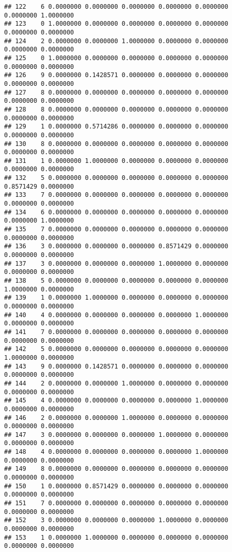 \documentclass[
]{article}
\begin{document}
\begin{verbatim}
## 122    6 0.0000000 0.0000000 0.0000000 0.0000000 0.0000000 0.0000000 1.0000000
## 123    0 1.0000000 0.0000000 0.0000000 0.0000000 0.0000000 0.0000000 0.0000000
## 124    2 0.0000000 0.0000000 1.0000000 0.0000000 0.0000000 0.0000000 0.0000000
## 125    0 1.0000000 0.0000000 0.0000000 0.0000000 0.0000000 0.0000000 0.0000000
## 126    9 0.0000000 0.1428571 0.0000000 0.0000000 0.0000000 0.0000000 0.0000000
## 127    8 0.0000000 0.0000000 0.0000000 0.0000000 0.0000000 0.0000000 0.0000000
## 128    8 0.0000000 0.0000000 0.0000000 0.0000000 0.0000000 0.0000000 0.0000000
## 129    1 0.0000000 0.5714286 0.0000000 0.0000000 0.0000000 0.0000000 0.0000000
## 130    8 0.0000000 0.0000000 0.0000000 0.0000000 0.0000000 0.0000000 0.0000000
## 131    1 0.0000000 1.0000000 0.0000000 0.0000000 0.0000000 0.0000000 0.0000000
## 132    5 0.0000000 0.0000000 0.0000000 0.0000000 0.0000000 0.8571429 0.0000000
## 133    7 0.0000000 0.0000000 0.0000000 0.0000000 0.0000000 0.0000000 0.0000000
## 134    6 0.0000000 0.0000000 0.0000000 0.0000000 0.0000000 0.0000000 1.0000000
## 135    7 0.0000000 0.0000000 0.0000000 0.0000000 0.0000000 0.0000000 0.0000000
## 136    3 0.0000000 0.0000000 0.0000000 0.8571429 0.0000000 0.0000000 0.0000000
## 137    3 0.0000000 0.0000000 0.0000000 1.0000000 0.0000000 0.0000000 0.0000000
## 138    5 0.0000000 0.0000000 0.0000000 0.0000000 0.0000000 1.0000000 0.0000000
## 139    1 0.0000000 1.0000000 0.0000000 0.0000000 0.0000000 0.0000000 0.0000000
## 140    4 0.0000000 0.0000000 0.0000000 0.0000000 1.0000000 0.0000000 0.0000000
## 141    7 0.0000000 0.0000000 0.0000000 0.0000000 0.0000000 0.0000000 0.0000000
## 142    5 0.0000000 0.0000000 0.0000000 0.0000000 0.0000000 1.0000000 0.0000000
## 143    9 0.0000000 0.1428571 0.0000000 0.0000000 0.0000000 0.0000000 0.0000000
## 144    2 0.0000000 0.0000000 1.0000000 0.0000000 0.0000000 0.0000000 0.0000000
## 145    4 0.0000000 0.0000000 0.0000000 0.0000000 1.0000000 0.0000000 0.0000000
## 146    2 0.0000000 0.0000000 1.0000000 0.0000000 0.0000000 0.0000000 0.0000000
## 147    3 0.0000000 0.0000000 0.0000000 1.0000000 0.0000000 0.0000000 0.0000000
## 148    4 0.0000000 0.0000000 0.0000000 0.0000000 1.0000000 0.0000000 0.0000000
## 149    8 0.0000000 0.0000000 0.0000000 0.0000000 0.0000000 0.0000000 0.0000000
## 150    1 0.0000000 0.8571429 0.0000000 0.0000000 0.0000000 0.0000000 0.0000000
## 151    7 0.0000000 0.0000000 0.0000000 0.0000000 0.0000000 0.0000000 0.0000000
## 152    3 0.0000000 0.0000000 0.0000000 1.0000000 0.0000000 0.0000000 0.0000000
## 153    1 0.0000000 1.0000000 0.0000000 0.0000000 0.0000000 0.0000000 0.0000000

\end{verbatim}
\end{document}
